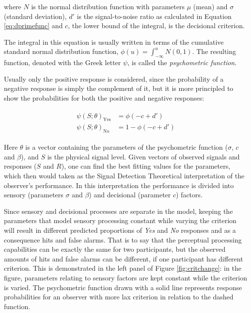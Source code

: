 \documentclass{article}\usepackage{knitr}
\begin{document}
where $N$ is the normal distribution function with parameters $\mu$ (mean) and $\sigma$ (standard deviation), $d'$ is the signal-to-noise ratio as calculated in Equation \ref{eq:dprimefunc} and $c$, the lower bound of the integral, is the decisional criterion. 

The integral in this equation is usually written in terms of the cumulative standard normal distribution function, $\phi(u) = \int_{-\infty}^{u} N(0, 1)$. The resulting function, denoted with the Greek letter $\psi$, is called the \textit{psychometric function}. \cite[Chapter 4]{kingdomprins2010}

Usually only the positive response is considered, since the probability of a negative response is simply the complement of it, but it is more principled to show the probabilities for both the positive and negative responses:

\begin{align*}
\begin{split}
\psi(S; \theta)_{\text{Yes}} &= \phi(-c + d') \\
\psi(S; \theta)_{\text{No}} &=  1 - \phi(-c + d')
\end{split}
\end{align*}

Here $\theta$ is a vector containing the parameters of the psychometric function ($\sigma$, $c$ and $\beta$), and $S$ is the physical signal level. Given vectors of observed signals and responses ($S$ and $R$), one can find the best fitting values for the parameters, which then would taken as the Signal Detection Theoretical interpretation of the observer's performance. In this interpretation the performance is divided into sensory (parameters $\sigma$ and $\beta$) and decisional (parameter $c$) factors.

Since sensory and decisional processes are separate in the model, keeping the parameters that model sensory processing constant while varying the criterion will result in different predicted proportions of \textit{Yes} and \textit{No} responses and as a consequence hits and false alarms. That is to say that the perceptual processing capabilities can be exactly the same for two participants, but the observed amounts of hits and false alarms can be different, if one participant has different criterion. This is demonstrated in the left panel of Figure \ref{fig:critchange}: in the figure, parameters relating to sensory factors are kept constant while the criterion is varied. The psychometric function drawn with a solid line represents response probabilities for an observer with more lax criterion in relation to the dashed function.
\end{document}
